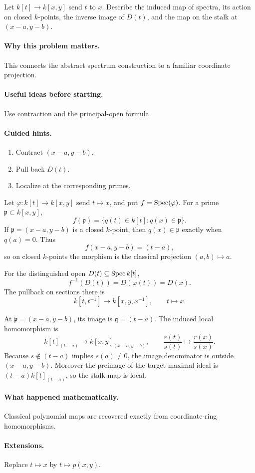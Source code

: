 \begin{problem}[Projection $\A^2\to\A^1$]\label{prob:vi19-p05}
Let $k[t]\to k[x,y]$ send $t$ to $x$. Describe the induced map of spectra, its action on closed $k$-points, the inverse image of $D(t)$, and the map on the stalk at $(x-a,y-b)$.
\end{problem}

\ifdefined\FullProblemDossiers
\paragraph{Why this problem matters.}
This connects the abstract spectrum construction to a familiar coordinate projection.

\paragraph{Useful ideas before starting.}
Use contraction and the principal-open formula.

\paragraph{Guided hints.}
\begin{enumerate}
\item Contract $(x-a,y-b)$.
\item Pull back $D(t)$.
\item Localize at the corresponding primes.
\end{enumerate}

\begin{solution}
Let \(\varphi:k[t]\to k[x,y]\) send \(t\mapsto x\), and put \(f=\operatorname{Spec}(\varphi)\).  For a prime \(\mathfrak p\subset k[x,y]\),
\[
f(\mathfrak p)=\{q(t)\in k[t]:q(x)\in\mathfrak p\}.
\]
If \(\mathfrak p=(x-a,y-b)\) is a closed \(k\)-point, then \(q(x)\in\mathfrak p\) exactly when \(q(a)=0\).  Thus
\[
f(x-a,y-b)=(t-a),
\]
so on closed \(k\)-points the morphism is the classical projection \((a,b)\mapsto a\).

For the distinguished open \(D(t)\subseteq\operatorname{Spec} k[t]\),
\[
f^{-1}(D(t))=D(\varphi(t))=D(x).
\]
The pullback on sections there is
\[
k[t,t^{-1}]\to k[x,y,x^{-1}],
\qquad t\longmapsto x.
\]

At \(\mathfrak p=(x-a,y-b)\), its image is \(\mathfrak q=(t-a)\).  The induced local homomorphism is
\[
k[t]_{(t-a)}\longrightarrow k[x,y]_{(x-a,y-b)},
\qquad
\frac{r(t)}{s(t)}\longmapsto\frac{r(x)}{s(x)}.
\]
Because \(s\notin(t-a)\) implies \(s(a)\neq0\), the image denominator is outside \((x-a,y-b)\).  Moreover the preimage of the target maximal ideal is \((t-a)k[t]_{(t-a)}\), so the stalk map is local.
\end{solution}

\paragraph{What happened mathematically.}
Classical polynomial maps are recovered exactly from coordinate-ring homomorphisms.

\paragraph{Extensions.}
Replace $t\mapsto x$ by $t\mapsto p(x,y)$.
\fi
